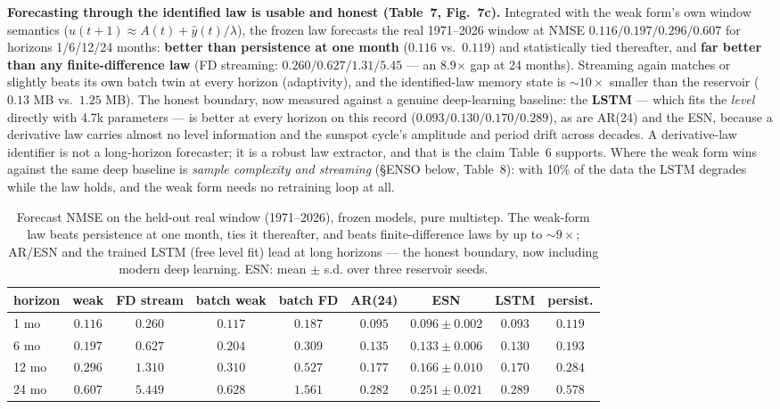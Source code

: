 \documentclass[10pt]{article}
\begin{document}
\textbf{Forecasting through the identified law is usable and honest (Table~7,
Fig.~7c).} Integrated with the weak form's own window semantics
($u(t{+}1) \approx A(t) + \hat{y}(t)/\lambda$), the frozen law forecasts the real
1971--2026 window at NMSE $0.116/0.197/0.296/0.607$ for horizons
1/6/12/24 months: \textbf{better than persistence at one month} ($0.116$ vs.\
$0.119$) and statistically tied thereafter, and \textbf{far better than any
finite-difference law} (FD streaming: $0.260/0.627/1.31/5.45$ --- an
8.9$\times$ gap at 24 months). Streaming again matches or slightly beats its
own batch twin at every horizon (adaptivity), and the identified-law memory
state is ${\sim}10\times$ smaller than the reservoir ($0.13$ MB vs.\ $1.25$ MB).
The honest boundary, now measured against a genuine deep-learning baseline: the
\textbf{LSTM} --- which fits the \emph{level} directly with 4.7k parameters --- is
better at every horizon on this record ($0.093/0.130/0.170/0.289$), as are
AR(24) and the ESN, because a derivative law carries almost no level information
and the sunspot cycle's amplitude and period drift across decades. A
derivative-law identifier is not a long-horizon forecaster; it is a robust law
extractor, and that is the claim Table~6 supports. Where the weak form wins
against the same deep baseline is \emph{sample complexity and streaming}
(\S ENSO below, Table~8): with 10\% of the data the LSTM degrades while the law
holds, and the weak form needs no retraining loop at all.

\begin{table}[h]
\centering\footnotesize
\caption{Forecast NMSE on the held-out real window (1971--2026), frozen models,
pure multistep. The weak-form law beats persistence at one month, ties it
thereafter, and beats finite-difference laws by up to ${\sim}9\times$; AR/ESN
and the trained LSTM (free level fit) lead at long horizons --- the honest
boundary, now including modern deep learning. ESN: mean $\pm$ s.d. over three
reservoir seeds.}
\begin{tabular}{lcccccccc}
\toprule
horizon & weak & FD stream & batch weak & batch FD & AR(24) & ESN & LSTM & persist. \\
\midrule
1 mo & $0.116$ & $0.260$ & $0.117$ & $0.187$ & $0.095$ & $0.096{\pm}0.002$ & $0.093$ & $0.119$ \\
6 mo & $0.197$ & $0.627$ & $0.204$ & $0.309$ & $0.135$ & $0.133{\pm}0.006$ & $0.130$ & $0.193$ \\
12 mo & $0.296$ & $1.310$ & $0.310$ & $0.527$ & $0.177$ & $0.166{\pm}0.010$ & $0.170$ & $0.284$ \\
24 mo & $0.607$ & $5.449$ & $0.628$ & $1.561$ & $0.282$ & $0.251{\pm}0.021$ & $0.289$ & $0.578$ \\
\bottomrule
\end{tabular}
\end{table}
\end{document}
